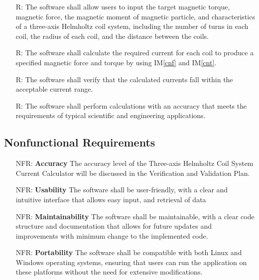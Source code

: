 \documentclass[12pt]{article}
\newcommand{\iref}[1]{IM\ref{#1}}
\newcounter{reqnum} %
\newcounter{nfrnum} %
\begin{document}
\noindent \begin{itemize}

\item[R\refstepcounter{reqnum}\thereqnum \label{R_Inputs}:] {The software shall allow users to input the target magnetic torque, magnetic force, the magnetic moment of magnetic particle, and characteristics of a three-axis Helmholtz coil system, including the number of turns in each coil, the radius of each coil, and the distance between the coils.}

\item[R\refstepcounter{reqnum}\thereqnum \label{R_Calculate1}:] {The software shall calculate the required current for each coil to produce a specified magnetic force and torque by using \iref{cnf} and \iref{cnt}.}

\item[R\refstepcounter{reqnum}\thereqnum \label{R_output}:] {The software shall verify that the calculated currents fall within the acceptable current range.}

\item[R\refstepcounter{reqnum}\thereqnum \label{R_Output}:] {The software shall perform calculations with an accuracy that meets the requirements of typical scientific and engineering applications.}

\end{itemize}

\subsection{Nonfunctional Requirements}

\noindent \begin{itemize}

\item[NFR\refstepcounter{nfrnum}\thenfrnum \label{NFR_Accuracy}:]
  \textbf{Accuracy}{ The accuracy level of the Three-axis Helmholtz Coil System Current Calculator will be discussed in the Verification and Validation Plan.}

\item[NFR\refstepcounter{nfrnum}\thenfrnum \label{NFR_Usability}:]
 \textbf{Usability}{ The software shall be user-friendly, with a clear and intuitive interface that allows easy input, and retrieval of data}

\item[NFR\refstepcounter{nfrnum}\thenfrnum \label{NFR_Maintainability}:]
  \textbf{Maintainability}{ The software shall be maintainable, with a clear code structure and documentation that allows for future updates and improvements with minimum change to the implemented code.}

\item[NFR\refstepcounter{nfrnum}\thenfrnum \label{NFR_Portability}:]
  \textbf{Portability}{ The software shall be compatible with both Linux and Windows operating systems, ensuring that users can run the application on these platforms without the need for extensive modifications. }


\end{itemize}
\end{document}
